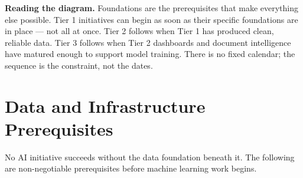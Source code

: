 \documentclass[10pt]{article}
\newcommand{\spacer}{\vspace{10pt}}
\newcommand{\bigspacer}{\vspace{16pt}}
\begin{document}
\begin{center}
\end{center}

\spacer
{\small\color{darkgrey}
\textbf{Reading the diagram.}\enspace
Foundations are the prerequisites that make everything else possible. Tier 1
initiatives can begin as soon as their specific foundations are in place ---
not all at once. Tier 2 follows when Tier 1 has produced clean, reliable data.
Tier 3 follows when Tier 2 dashboards and document intelligence have matured
enough to support model training. There is no fixed calendar; the sequence is
the constraint, not the dates.
}

\bigspacer

\section{Data and Infrastructure Prerequisites}

No AI initiative succeeds without the data foundation beneath it. The
following are non-negotiable prerequisites before machine learning work
begins.

\spacer
\end{document}

